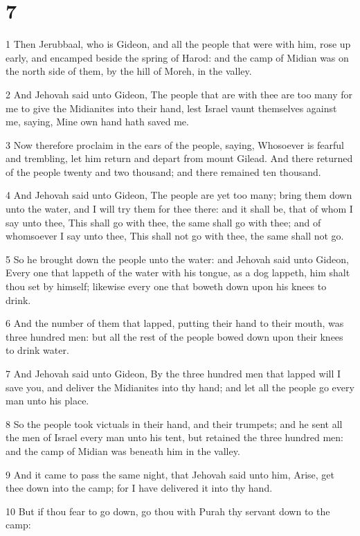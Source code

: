 \chapter{7}

\par 1 Then Jerubbaal, who is Gideon, and all the people that were with him, rose up early, and encamped beside the spring of Harod: and the camp of Midian was on the north side of them, by the hill of Moreh, in the valley.
\par 2 And Jehovah said unto Gideon, The people that are with thee are too many for me to give the Midianites into their hand, lest Israel vaunt themselves against me, saying, Mine own hand hath saved me.
\par 3 Now therefore proclaim in the ears of the people, saying, Whosoever is fearful and trembling, let him return and depart from mount Gilead. And there returned of the people twenty and two thousand; and there remained ten thousand.
\par 4 And Jehovah said unto Gideon, The people are yet too many; bring them down unto the water, and I will try them for thee there: and it shall be, that of whom I say unto thee, This shall go with thee, the same shall go with thee; and of whomsoever I say unto thee, This shall not go with thee, the same shall not go.
\par 5 So he brought down the people unto the water: and Jehovah said unto Gideon, Every one that lappeth of the water with his tongue, as a dog lappeth, him shalt thou set by himself; likewise every one that boweth down upon his knees to drink.
\par 6 And the number of them that lapped, putting their hand to their mouth, was three hundred men: but all the rest of the people bowed down upon their knees to drink water.
\par 7 And Jehovah said unto Gideon, By the three hundred men that lapped will I save you, and deliver the Midianites into thy hand; and let all the people go every man unto his place.
\par 8 So the people took victuals in their hand, and their trumpets; and he sent all the men of Israel every man unto his tent, but retained the three hundred men: and the camp of Midian was beneath him in the valley.
\par 9 And it came to pass the same night, that Jehovah said unto him, Arise, get thee down into the camp; for I have delivered it into thy hand.
\par 10 But if thou fear to go down, go thou with Purah thy servant down to the camp:

